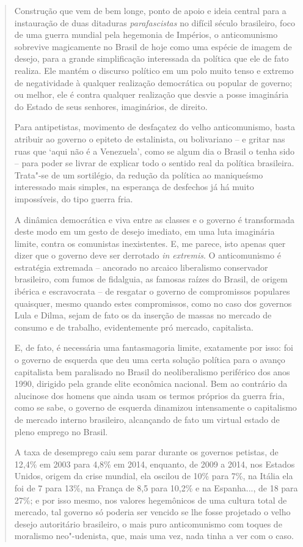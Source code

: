 \begin{quote}
Construção que vem de bem longe, ponto de apoio e ideia central para a
instauração de duas ditaduras \emph{parafascistas} no difícil século 
brasileiro, foco de uma guerra mundial pela hegemonia de Impérios, o
anticomunismo sobrevive magicamente no Brasil de hoje como uma espécie
de imagem de desejo, para a grande simplificação interessada da política
que ele de fato realiza. Ele mantém o discurso político em um polo muito
tenso e extremo de negatividade à qualquer realização democrática ou
popular de governo; ou melhor, ele é contra qualquer realização que
desvie a posse imaginária do Estado de seus senhores, imaginários, de
direito.

Para antipetistas, movimento de desfaçatez do velho anticomunismo, basta
atribuir ao governo o epiteto de estalinista, ou bolivariano -- e gritar
nas ruas que `aqui não é a Venezuela', como se algum dia o Brasil o
tenha sido -- para poder se livrar de explicar todo o sentido real da
política brasileira. Trata"-se de um sortilégio, da redução da política
ao maniqueísmo interessado mais simples, na esperança de desfechos já há
muito impossíveis, do tipo guerra fria.

A dinâmica democrática e viva entre as classes e o governo é
transformada deste modo em um gesto de desejo imediato, em uma luta
imaginária limite, contra os comunistas inexistentes. E, me parece, isto
apenas quer dizer que o governo deve ser derrotado \emph{in extremis}. O
anticomunismo é estratégia extremada -- ancorado no arcaico liberalismo
conservador brasileiro, com fumos de fidalguia, as famosas raízes do
Brasil, de origem ibérica e escravocrata -- de resgatar o governo de
compromissos populares quaisquer, mesmo quando estes compromissos, como
no caso dos governos Lula e Dilma, sejam de fato os da inserção de
massas no mercado de consumo e de trabalho, evidentemente pró mercado,
capitalista.

E, de fato, é necessária uma fantasmagoria limite, exatamente por isso:
foi o governo de esquerda que deu uma certa solução política para o
avanço capitalista bem paralisado no Brasil do neoliberalismo periférico
dos anos 1990, dirigido pela grande elite econômica nacional. Bem ao
contrário da alucinose dos homens que ainda usam os termos próprios da
guerra fria, como se sabe, o governo de esquerda dinamizou intensamente
o capitalismo de mercado interno brasileiro, alcançando de fato um
virtual estado de pleno emprego no Brasil.

A taxa de desemprego caiu sem parar durante os governos petistas, de
12,4\% em 2003 para 4,8\% em 2014, enquanto, de 2009 a 2014, nos Estados
Unidos, origem da crise mundial, ela oscilou de 10\% para 7\%, na Itália
ela foi de 7 para 13\%, na França de 8,5 para 10,2\% e na Espanha..., de
18 para 27\%; e por isso mesmo, nos valores hegemônicos de uma cultura
total de mercado, tal governo só poderia ser vencido se lhe fosse
projetado o velho desejo autoritário brasileiro, o mais puro
anticomunismo com toques de moralismo neo"-udenista, que, mais uma vez,
nada tinha a ver com o caso.


\end{quote}
